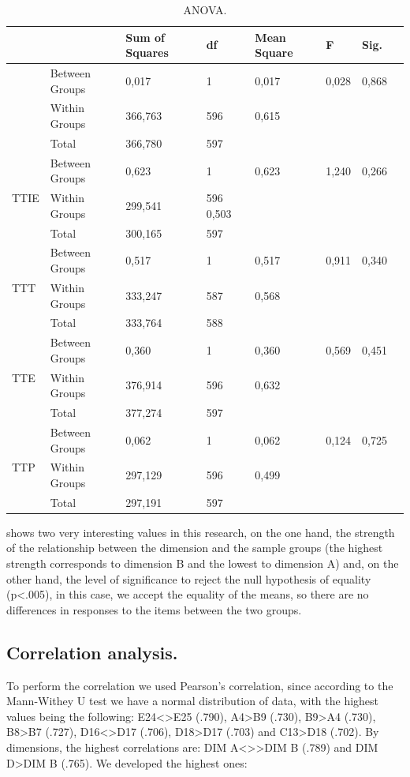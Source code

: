 \documentclass{textolivre}
\begin{document}
\begin{table}[htpb]
\caption{ANOVA.}
\label{tab4}
\centering
\begin{tabular}{p{}lllllll}
\toprule 
& & Sum of Squares & df & Mean Square & F & Sig.
\\
\midrule
\arrayrulecolor[gray]{.7}
\multirow{3}{*}{TT} & Between Groups & 0,017 & 1 & 0,017 & 0,028 & 0,868 \\
& Within Groups & 366,763 & 596 & 0,615 & & \\
& Total & 366,780 & 597 & & & \\
\midrule
\multirow{3}{*}{TTIE} & Between Groups & 0,623 & 1 & 0,623 & 1,240 & 0,266 \\
& Within Groups & 299,541 & 596 0,503 & & \\
& Total & 300,165 & 597 & & & \\
\midrule
\multirow{3}{*}{TTT} & Between Groups & 0,517 & 1 & 0,517 & 0,911 & 0,340 \\
& Within Groups & 333,247 & 587 & 0,568 & & \\
& Total & 333,764 & 588 & & & \\
\midrule
\multirow{3}{*}{TTE} & Between Groups & 0,360 & 1 & 0,360 & 0,569 & 0,451 \\
& Within Groups & 376,914 & 596 & 0,632 & & \\
& Total & 377,274 & 597 & & & \\
\midrule
\multirow{3}{*}{TTP} & Between Groups & 0,062 & 1 & 0,062 & 0,124 & 0,725 \\
& Within Groups & 297,129 & 596 & 0,499 & & \\
& Total & 297,191 & 597 & & & \\
\bottomrule
\end{tabular}
\centering
\end{table}

 shows two very interesting values in this research, on the one hand, the strength of the relationship between the dimension and the sample groups (the highest strength corresponds to dimension B and the lowest to dimension A) and, on the other hand, the level of significance to reject the null hypothesis of equality (p<.005), in this case, we accept the equality of the means, so there are no differences in responses to the items between the two groups.

\subsection{Correlation analysis.}\label{subcorreanaly}
To perform the correlation we used Pearson's correlation, since according to the Mann-Withey U test we have a normal distribution of data, with the highest values being the following: E24<>E25 (.790), A4>B9 (.730), B9>A4 (.730), B8>B7 (.727), D16<>D17 (.706), D18>D17 (.703) and C13>D18 (.702). By dimensions, the highest correlations are: DIM A<>>DIM B (.789) and DIM D>DIM B (.765). We developed the highest ones:
\end{document}
